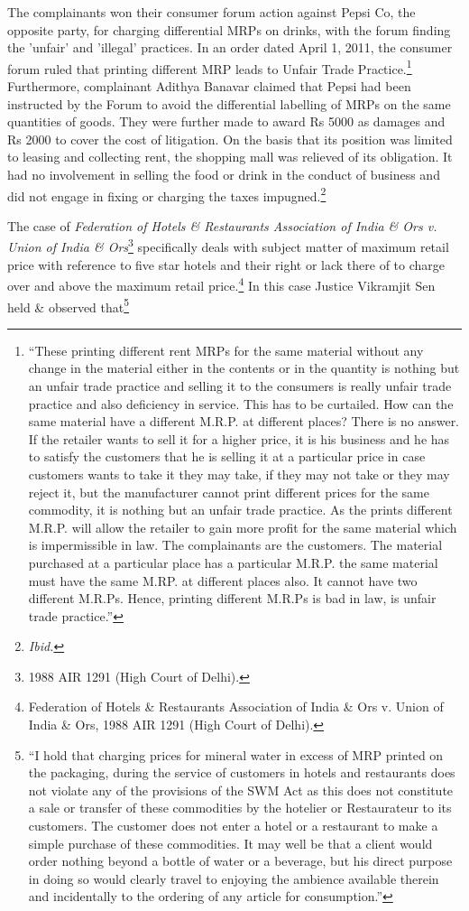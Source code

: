\begin{multicols}{2}
\noi
The complainants won their consumer forum action against Pepsi Co, the opposite party, for
charging differential MRPs on drinks, with the forum finding the 'unfair' and 'illegal' practices.
In an order dated April 1, 2011, the consumer forum ruled that printing different MRP leads to
Unfair Trade Practice.\footnote{“These printing different rent MRPs for the same material without any change in the material either in the contents or in the quantity is nothing but an unfair trade practice and selling it to the consumers is really unfair trade practice and also deficiency in service. This has to be curtailed. How can the same material have a different M.R.P. at different places? There is no answer. If the retailer wants to sell it for a higher price, it is his business and he has to satisfy the customers that he is selling it at a particular price in case customers wants to take it they may take, if they may not take or they may reject it, but the manufacturer cannot print different prices for the same commodity, it is nothing but an unfair trade practice. As the prints different M.R.P. will allow the retailer to gain more profit for the same material which is impermissible in law. The complainants are the customers. The material purchased at a particular place has a particular M.R.P. the same material must have the same M.RP. at different places also. It cannot have two different M.R.Ps. Hence, printing different M.R.Ps is bad in law, is unfair trade practice.”} Furthermore, complainant Adithya Banavar claimed that Pepsi had been instructed by the Forum to avoid the differential labelling of MRPs on the same quantities of goods. They were further made to award Rs 5000 as damages and Rs 2000 to cover the cost of litigation. On the basis that its position was limited to leasing and collecting rent, the shopping mall was relieved of its obligation. It had no involvement in selling the food or drink in the conduct of business and did not engage in fixing or charging the taxes impugned.\footnote{\textit{Ibid.}}

\noi
The case of \textit{Federation of Hotels \& Restaurants Association of India \& Ors v. Union of India \& Ors}\footnote{1988 AIR 1291 (High Court of Delhi).} specifically deals with subject matter of maximum retail price with reference to five star hotels and their right or lack there of to charge over and above the maximum retail price.\footnote{Federation of Hotels \& Restaurants Association of India \& Ors v. Union of India \& Ors, 1988 AIR 1291 (High Court of Delhi).} In this case Justice Vikramjit Sen held \& observed that\footnote{“I hold that charging prices for mineral water in excess of MRP printed on the packaging, during the service of customers in hotels and restaurants does not violate any of the provisions of the SWM Act as this does not constitute a sale or transfer of these commodities by the hotelier or Restaurateur to its customers. The customer does not enter a hotel or a restaurant to make a simple purchase of these commodities. It may well be that a client would order nothing beyond a bottle of water or a beverage, but his direct purpose in doing so would clearly travel to enjoying the ambience available therein and incidentally to the ordering of any article for consumption.”}


\end{multicols}
